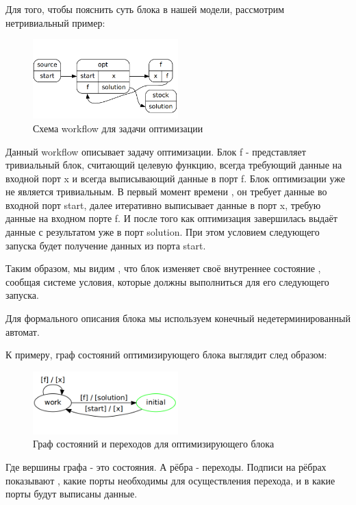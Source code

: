 \documentclass[a4paper,14pt]{article}
\begin{document}
Для того, чтобы пояснить суть блока в нашей модели, рассмотрим нетривиальный пример:

\begin{figure}[here]
    \centering
    \includegraphics[width=0.5\textwidth]{optimization_workflow.png}
    \caption{Схема workflow для задачи оптимизации}
    \label{img:opt_wf}
\end{figure}


Данный workflow описывает задачу оптимизации.
Блок f - представляет тривиальный блок, считающий целевую функцию, всегда требующий данные на входной порт x  и всегда выписывающий данные в порт f.
Блок оптимизации уже не является тривиальным. В первый момент времени , он требует данные во входной порт start, далее итеративно выписывает данные в порт x, требую данные на входном порте f. И после того как оптимизация завершилась выдаёт данные с результатом уже в порт solution. При этом условием следующего запуска будет получение данных из порта start.


Таким образом, мы видим , что блок изменяет своё внутреннее состояние , сообщая системе условия, которые должны выполниться для его следующего запуска.



Для формального описания блока мы используем конечный недетерминированный автомат.

 К примеру, граф состояний оптимизирующего блока выглядит след образом:
\begin{figure}[here]
    \centering
    \includegraphics[width=0.5\textwidth]{optimizer_block.png}
    \caption{Граф состояний и переходов для оптимизирующего блока }
    \label{img:opt_wf}
\end{figure}

Где вершины графа - это состояния. А рёбра -  переходы. Подписи на рёбрах показывают , какие порты необходимы для осуществления перехода, и в какие порты будут выписаны данные.
\end{document}
